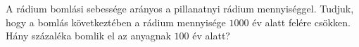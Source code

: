 A rádium bomlási sebessége arányos a pillanatnyi rádium mennyiséggel.
Tudjuk, hogy a bomlás következtében a rádium mennyisége $1000$ év alatt
felére csökken. Hány százaléka bomlik el az anyagnak $100$ év alatt?
